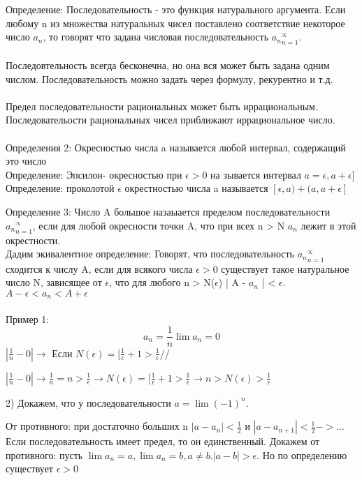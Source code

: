 \documentclass[a4paper]{article}
\begin{document}
Определение: Последовательность - это функция натурального аргумента. Если любому n из множества натуральных чисел поставлено соответствие некоторое число $a_n$, то говорят что задана числовая последовательность ${a_n}_{n=1}^\varpropto$.
\\
\\
Последовтельность всегда бесконечна, но она вся может быть задана одним числом.
Последовательность можно задать через формулу, рекурентно и т.д.
\\
\\
Предел последовательности рациональных может быть иррациональным.
Последовательости рациональных чисел приближают иррациональное число.
\\
\\
Определения 2: Окресностью числа a называется любой интервал, содержащий это число\\
Определение:
Эпсилон- окресностью при $\epsilon > 0$ на зывается интервал $a = \epsilon, a + \epsilon]$\\
Определение: проколотой $\epsilon$ окрестностью числа a называется $[\epsilon, a) + (a, a + \epsilon]$

Определение 3: Число A большое назаыается пределом последовательности ${a_n}_{n=1}^\varpropto$, если для любой окресности точки A, что при всех n >
N $a_n$ лежит в этой окрестности.  
\\
Дадим экивалентное определение: Говорят, что последовательность ${a_n}_{n=1}^\varpropto$ сходится к числу A, если для всякого числа $\epsilon >0$ существует такое натуральное число N, зависящее от $\epsilon$, что для любого n > N($\epsilon$) | A - $a_n$ | < $\epsilon$.\\
$A - \epsilon < a_n < A + \epsilon$
\\
\\
Пример 1:
$$a_n = \frac{1}{n} \lim a_n = 0$$
$|\frac{1}{n} - 0| \rightarrow $ Если $N(\epsilon) = [\frac{1}{\epsilon} + 1 > \frac{1}{\epsilon}$//


$|\frac{1}{n} - 0| \rightarrow \frac{1}{n} = n > \frac{1}{\epsilon} \rightarrow N(\epsilon) = [\frac{1}{\epsilon} + 1 > \frac{1}{\epsilon} \rightarrow n > N(\epsilon) > \frac{1}{\epsilon}$


2) Докажем, что у последовательности $a= \lim(-1)^n$.

От противного: при достаточно больших  n $|a - a_n| < \frac{1}{2}$ и $|a - a_{n + 1}| < \frac{1}{2} ->...$
\\
Если последовательность имеет предел, то он единственный. Докажем от противного: пусть $\lim a_n = a, \lim a_n = b, a \neq b.  | a- b | > \epsilon $.
Но по определению существует $\epsilon > 0$ 
\end{document}
